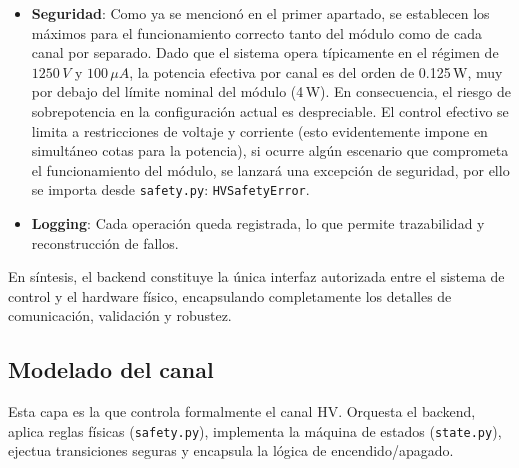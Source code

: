 \documentclass{article}
\begin{document}
\begin{itemize}
\begin{lstlisting}
        #En CAENBackend
        def set_votage(self, ch, value):
            # validaciones
            # chequeo de límites
            # envío de comando al instrumento
    \end{lstlisting}
    Aquí es donde ocurre la validación específica del hardware, complementaria a los límites estructurales definidos en \texttt{safety.py}\\

    \item \textbf{Seguridad}: \newline
    Como ya se mencionó en el primer apartado, se establecen los máximos para el funcionamiento correcto tanto del módulo como de cada canal por separado. Dado que el sistema opera típicamente en el régimen de $1250\,V$ y $100\,\mu A$,
    la potencia efectiva por canal es del orden de 0.125\,W, muy por debajo del límite nominal del módulo (4\,W). En consecuencia, el riesgo de sobrepotencia en la configuración actual es despreciable.
    El control efectivo se limita a restricciones de voltaje y corriente (esto evidentemente impone en simultáneo cotas para la potencia),  si ocurre algún escenario que comprometa el funcionamiento del módulo, se lanzará una excepción de seguridad, por ello se importa desde \texttt{safety.py}: \texttt{HVSafetyError}.

    \item \textbf{Logging}: \newline
    Cada operación queda registrada, lo que permite trazabilidad y reconstrucción de fallos. 
\end{itemize}

En síntesis, el backend constituye la única interfaz autorizada
entre el sistema de control y el hardware físico, encapsulando
completamente los detalles de comunicación, validación y robustez. \\

\subsection{Modelado del canal}
Esta capa es la que controla formalmente  el canal HV. Orquesta el backend, aplica reglas físicas (\texttt{safety.py}), implementa la máquina de estados (\texttt{state.py}), ejectua transiciones seguras y encapsula la lógica de encendido/apagado. 
\end{document}
